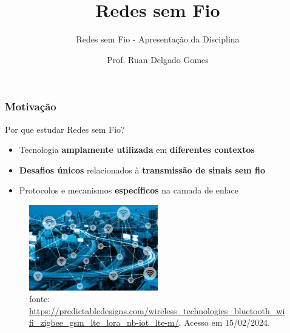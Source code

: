 \documentclass[10pt,xcolor=table]{beamer}
\title{Redes sem Fio}
\subtitle{Redes sem Fio - Apresentação da Disciplina}
\date{}
\author{Prof. Ruan Delgado Gomes}
\institute{UA2 - IFPB}
\begin{document}
\maketitle



\begin{frame}
	\frametitle{Motivação}
    \begin{block}{Por que estudar Redes sem Fio?}
		\begin{itemize}
			\item Tecnologia \textbf{amplamente utilizada} em \textbf{diferentes contextos}
            \vspace{2mm}
            \item \textbf{Desafios únicos} relacionados à \textbf{transmissão de sinais sem fio}
            \vspace{2mm}
            \item Protocolos e mecanismos \textbf{específicos} na camada de enlace
		\end{itemize}
	\end{block}
	\begin{figure}[htbp]
	\includegraphics[width=0.5\textwidth]{figuras/WirelessNetwork-1.jpg}\\
 	\tiny 
  fonte: \url{https://predictabledesigns.com/wireless_technologies_bluetooth_wifi_zigbee_gsm_lte_lora_nb-iot_lte-m/}. Acesso em 15/02/2024.
	\end{figure}
\end{frame}
\end{document}
